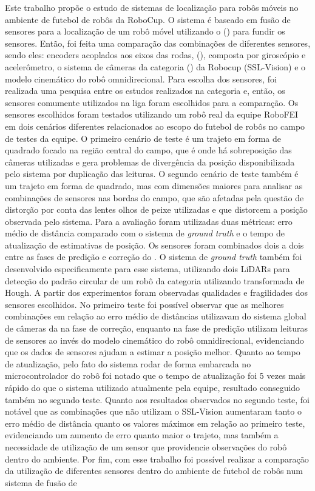 \documentclass[acronym, symbols, table]{fei}
\begin{document}
\begin{resumo}
	Este trabalho propõe o estudo de sistemas de localização para robôs móveis no ambiente de futebol de robôs da RoboCup. O sistema é baseado em fusão de sensores para a localização de um robô móvel utilizando o  () para fundir os sensores. Então, foi feita uma comparação das combinações de diferentes sensores, sendo eles: encoders acoplados aos eixos das rodas,  (), composta por giroscópio e acelerômetro, o sistema de câmeras da categoria  () da Robocup (SSL-Vision) e o modelo cinemático do robô omnidirecional. Para escolha dos sensores, foi realizada uma pesquisa entre os estudos realizados na categoria  e, então, os sensores comumente utilizados na liga foram escolhidos para a comparação. Os sensores escolhidos foram testados utilizando um robô real da equipe RoboFEI em dois cenários diferentes relacionados ao escopo do futebol de robôs no campo de testes da equipe. O primeiro cenário de teste é um trajeto em forma de quadrado focado na região central do campo, que é onde há sobreposição das câmeras utilizadas e gera problemas de divergência da posição disponibilizada pelo sistema por duplicação das leituras. O segundo cenário de teste também é um trajeto em forma de quadrado, mas com dimensões maiores para analisar as combinações de sensores nas bordas do campo, que são afetadas pela questão de distorção por conta das lentes olhos de peixe utilizadas e que distorcem a posição observada pelo sistema. Para a avaliação foram utilizadas duas métricas: erro médio de distância comparado com o sistema de \textit{ground truth} e o tempo de atualização de estimativas de posição. Os sensores foram combinados dois a dois entre as fases de predição e correção do . O sistema de \textit{ground truth} também foi desenvolvido especificamente para esse sistema, utilizando dois LiDARs para detecção do padrão circular de um robô da categoria  utilizando transformada de Hough. A partir dos experimentos foram observadas qualidades e fragilidades dos sensores escolhidos. No primeiro teste foi possível observar que as melhores combinações em relação ao erro médio de distâncias utilizavam do sistema global de câmeras da  na fase de correção, enquanto na fase de predição utilizam leituras de sensores ao invés do modelo cinemático do robô omnidirecional, evidenciando que os dados de sensores ajudam a estimar a posição melhor. Quanto ao tempo de atualização, pelo fato do sistema rodar de forma embarcada no microcontrolador do robô foi notado que o tempo de atualização foi 5 vezes mais rápido do que o sistema utilizado atualmente pela equipe, resultado conseguido também no segundo teste. Quanto aos resultados observados no segundo teste, foi notável que as combinações que não utilizam o SSL-Vision aumentaram tanto o erro médio de distância quanto os valores máximos em relação ao primeiro teste, evidenciando um aumento de erro quanto maior o trajeto, mas também a necessidade de utilização de um sensor que providencie observações do robô dentro do ambiente. Por fim, com esse trabalho foi possível realizar a comparação da utilização de diferentes sensores dentro do ambiente de futebol de robôs num sistema de fusão de 
\end{resumo}
\end{document}
